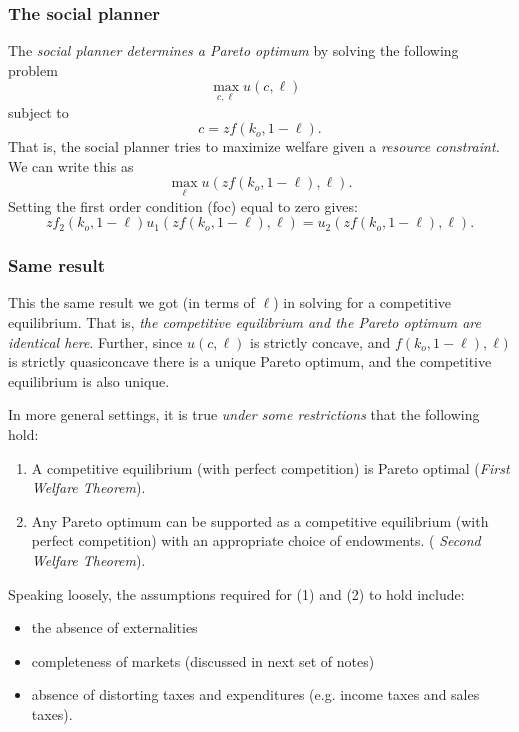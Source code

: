 \documentclass[aspectratio=169]{ltx-talk}
\begin{document}
\begin{frame}
\frametitle{The social planner }
The \textit{social planner determines a Pareto optimum }by solving the
following problem%
\begin{equation*}
\underset{c,\ell }{\max }u(c,\ell )\text{ }
\end{equation*}%
subject to%
\begin{equation*}
c=zf\left( k_{o},1-\ell \right) .
\end{equation*}%
That is, the social planner tries to maximize welfare given a \textit{%
resource constraint. }We can write this as 
\begin{equation*}
\underset{\ell }{\max }u(zf\left( k_{o},1-\ell \right) ,\ell )\text{.}
\end{equation*}%
Setting the first order condition (foc) equal to zero gives:%
\begin{equation*}
zf_{2}\left( k_{o},1-\ell \right) u_{1}(zf\left( k_{o},1-\ell \right) ,\ell
)=u_{2}(zf\left( k_{o},1-\ell \right) ,\ell ).
\end{equation*}%
\end{frame}

\begin{frame}
\frametitle{Same result }
This the same result we got (in terms of $\ell $) in solving for a
competitive equilibrium. That is, \textit{the competitive equilibrium and
the Pareto optimum are identical here}. Further, since $u(c,\ell )$ is
strictly concave, and $f\left( k_{o},1-\ell \right) ,\ell )$ is strictly
quasiconcave there is a unique Pareto optimum, and the competitive
equilibrium is also unique.

\noindent In more general settings, it is true \textit{under some
restrictions} that the following hold:

\begin{enumerate}
\item A competitive equilibrium (with perfect competition) is Pareto optimal
(\textit{First Welfare Theorem}).

\item Any Pareto optimum can be supported as a competitive equilibrium (with
perfect competition) with an appropriate choice of endowments. (\textit{%
Second Welfare Theorem}).
\end{enumerate}

Speaking loosely, the assumptions required for (1) and (2) to hold include:%

\par{}


\begin{itemize}
\item the absence of externalities

\item completeness of markets (discussed in next set of notes)

\item absence of distorting taxes and expenditures (e.g. income taxes and
sales taxes).
\end{itemize}
\end{frame}
\end{document}
